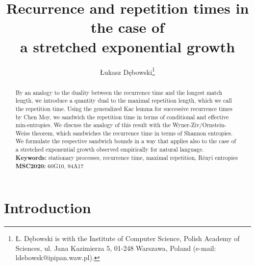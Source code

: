 \documentclass[a4paper,12pt]{article}
\author{{\L}ukasz D\k{e}bowski\thanks{
    {\L}. D\k{e}bowski is with
    the Institute of Computer Science, Polish Academy of Sciences, 
    ul. Jana Kazimierza 5, 01-248 Warszawa, Poland 
    (e-mail: ldebowsk@ipipan.waw.pl).
  }
}
\title{Recurrence and repetition times in the case of \\ a stretched
  exponential growth} \date{}
\begin{document}
\begin{titlepage}
\maketitle

\begin{abstract}
  By an analogy to the duality between the recurrence time and the
  longest match length, we introduce a quantity dual to the maximal
  repetition length, which we call the repetition time.  Using the
  generalized Kac lemma for successive recurrence times by Chen Moy,
  we sandwich the repetition time in terms of conditional and
  effective min-entropies.
  We discuss the analogy of this result with the
  Wyner-Ziv/Ornstein-Weiss theorem, which sandwiches the recurrence
  time in terms of Shannon entropies. We formulate the respective
  sandwich bounds in a way that applies also to the case of a
  stretched exponential growth observed empirically for natural
  language.
%
  \\[1em]
  \textbf{Keywords:} stationary processes, recurrence time, maximal
  repetition, R\'enyi entropies
  \\[1em]
  \textbf{MSC2020:} 60G10, 94A17
\end{abstract}



\end{titlepage}


\section{Introduction}
\label{secIntroduction}
\end{document}
